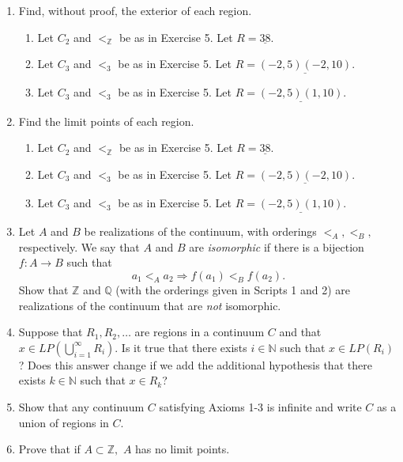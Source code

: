 \documentclass[11pt]{article}
\newcommand{\bbN}{\mathbb{N}}
\newcommand{\bbQ}{\mathbb{Q}}
\newcommand{\bbZ}{\mathbb{Z}}
\renewcommand{\_}[1]{\underline{ #1 }}
\theoremstyle{definition}
\numberwithin{equation}{subsection}
\begin{document}
\begin{enumerate}
\item
		Find, without proof, the exterior of each region.
		\begin{enumerate}
			\item Let $C_2$ and $<_\bbZ$ be as in Exercise 5.  Let $R = \underline{38}$.
			\item Let $C_3$ and $<_3$ be as in Exercise 5.  Let $R = \underline{(-2,5)(-2,10)}$.
			\item Let $C_3$ and $<_3$ be as in Exercise 5.  Let $R = \underline{(-2,5)(1,10)}$.
		\end{enumerate}



\item
		Find the limit points of each region.
		\begin{enumerate}
			\item Let $C_2$ and $<_\bbZ$ be as in Exercise 5.  Let $R = \underline{38}$.
			\item Let $C_3$ and $<_3$ be as in Exercise 5.  Let $R = \underline{(-2,5)(-2,10)}$.
			\item Let $C_3$ and $<_3$ be as in Exercise 5.  Let $R = \underline{(-2,5)(1,10)}$.
		\end{enumerate}


 

\item Let $A$ and $B$ be realizations of the continuum, with orderings $<_A, <_B,$ respectively. We say that $A$ and $B$ are {\em isomorphic} if there is a bijection $f:A\longrightarrow B$ such that 
$$a_1<_A a_2\Longrightarrow f(a_1)<_B f(a_2).$$
Show that $\bbZ$ and $\bbQ$ (with the orderings given in Scripts 1 and 2) are realizations of the continuum that are {\em not} isomorphic.




\item
Suppose that $R_1, R_2, \dots$ are regions in a continuum $C$ and that $x \in LP(\displaystyle \bigcup_{i=1}^\infty R_i)$.  Is it true that there exists $i \in \bbN$ such that $x \in LP(R_i)$?  Does this answer change if we add the additional hypothesis that there exists $k\in \bbN$ such that $x \in R_k$?

\item Show that any continuum $C$ satisfying Axioms 1-3 is infinite and write $C$ as a union of regions in $C.$



\item  Prove that if $A\subset\bbZ,$ $A $ has no limit points.




\end{enumerate}
\end{document}
